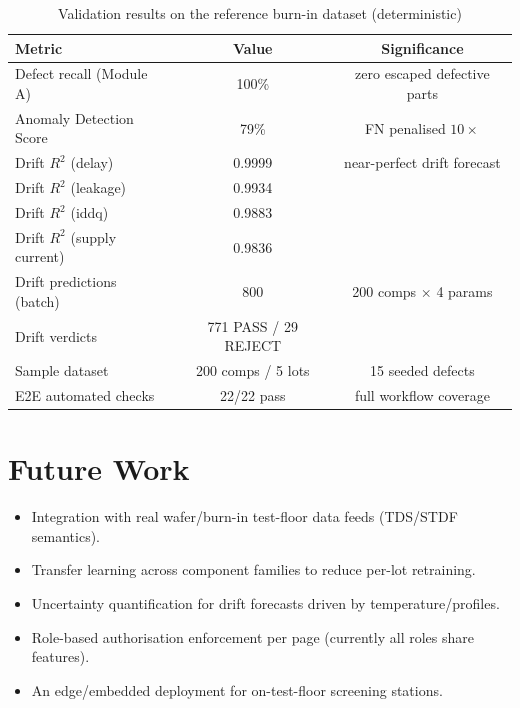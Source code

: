 \documentclass[11pt,a4paper]{article}
\begin{document}
\begin{table}[h]
  \centering
  \caption{Validation results on the reference burn-in dataset (deterministic)}
  \vspace{0.3cm}
  \begin{tabular}{lcc}
    \toprule
    \textbf{Metric} & \textbf{Value} & \textbf{Significance} \\
    \midrule
    Defect recall (Module A)          & 100\%   & zero escaped defective parts \\
    Anomaly Detection Score           & 79\%    & FN penalised $10\times$ \\
    Drift $R^2$ (delay)               & 0.9999  & near-perfect drift forecast \\
    Drift $R^2$ (leakage)             & 0.9934  & \\
    Drift $R^2$ (iddq)                & 0.9883  & \\
    Drift $R^2$ (supply current)      & 0.9836  & \\
    Drift predictions (batch)         & 800     & 200 comps $\times$ 4 params \\
    Drift verdicts                    & 771 PASS / 29 REJECT & \\
    Sample dataset                    & 200 comps / 5 lots & 15 seeded defects \\
    E2E automated checks              & 22/22 pass & full workflow coverage \\
    \bottomrule
  \end{tabular}
\end{table}

\section{Future Work}
\label{sec:future}

\begin{itemize}[leftmargin=1.5em]
  \item Integration with real wafer/burn-in test-floor data feeds (TDS/STDF semantics).
  \item Transfer learning across component families to reduce per-lot retraining.
  \item Uncertainty quantification for drift forecasts driven by temperature/profiles.
  \item Role-based authorisation enforcement per page (currently all roles share features).
  \item An edge/embedded deployment for on-test-floor screening stations.
\end{itemize}
\end{document}
